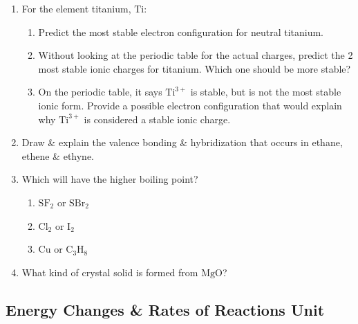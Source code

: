 \documentclass[12pt]{article}
\begin{document}
\begin{enumerate}[label=\arabic*.]
    \item For the element titanium, $\text{Ti}$:
    \begin{enumerate}[label=\alph*)]
        \item Predict the most stable electron configuration for neutral titanium.
        \vspace{2cm}
        \item Without looking at the periodic table for the actual charges, predict the 2 most stable ionic charges for titanium. Which one should be more stable?
        \vspace{2.5cm}
        \item On the periodic table, it says $\text{Ti}^{3+}$ is stable, but is not the most stable ionic form. Provide a possible electron configuration that would explain why $\text{Ti}^{3+}$ is considered a stable ionic charge.
        \vspace{3cm}
    \end{enumerate}

    \item Draw \& explain the valence bonding \& hybridization that occurs in ethane, ethene \& ethyne.
    \vspace{5cm}

    \item Which will have the higher boiling point?
    \begin{enumerate}[label=\alph*)]
        \item $\text{SF}_2$ or $\text{SBr}_2$
        \vspace{1.5cm}
        \item $\text{Cl}_2$ or $\text{I}_2$
        \vspace{1.5cm}
        \item $\text{Cu}$ or $\text{C}_3\text{H}_8$
        \vspace{1.5cm}
    \end{enumerate}

    \item What kind of crystal solid is formed from $\text{MgO}$?
    \vspace{2cm}
\end{enumerate}

\newpage

\subsection*{Energy Changes \& Rates of Reactions Unit}
\end{document}
